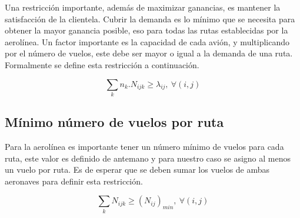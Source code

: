 \documentclass[12pt]{article}
\begin{document}
Una restricción importante, además de maximizar ganancias, es mantener la satisfacción de la clientela. Cubrir la demanda es lo mínimo que se necesita para obtener la mayor ganancia posible, eso para todas las rutas establecidas por la aerolínea. Un factor importante es la capacidad de cada avión, y multiplicando por el número de vuelos, este debe ser mayor o igual a la demanda de una ruta. Formalmente se define esta restricción a continuación.

\begin{equation}
    \sum_{k} n_{k}.N_{ijk} \geq \lambda_{ij},\ \forall (i,j)
\end{equation}

\subsection{Mínimo número de vuelos por ruta}

Para la aerolínea es importante tener un número mínimo de vuelos para cada ruta, este valor es definido de antemano y para nuestro caso se asigno al menos un vuelo por ruta. Es de esperar que se deben sumar los vuelos de ambas aeronaves para definir esta restricción.

\begin{equation}
    \sum_{k} N_{ijk} \geq (N_{ij})_{min},\ \forall (i,j)
\end{equation}
\end{document}
